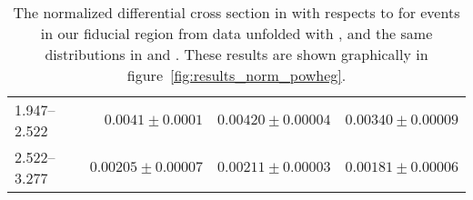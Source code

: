 \begin{table}
\begin{center}
\begin{tabular}{@{}l r r r@{}}
            1.947--2.522  &  $0.0041   \pm  0.0001$   &  $0.00420  \pm  0.00004$  &  $0.00340  \pm  0.00009$  \\
            2.522--3.277  &  $0.00205  \pm  0.00007$  &  $0.00211  \pm  0.00003$  &  $0.00181  \pm  0.00006$  \\
            \bottomrule
        \end{tabular}
    \end{center}
    \caption[
        The normalized differential cross section in \pb with respects to
        \phistar for \Ztoee events in our fiducial region from data unfolded
        with \POWHEG.
    ]{
        The normalized differential cross section in \pb with respects to
        \phistar for \Ztoee events in our fiducial region from data unfolded
        with \POWHEG, and the same distributions in \MADGRAPH and \POWHEG.
        These results are shown graphically in
        figure~\ref{fig:results_norm_powheg}.
    }
    \label{tab:results_norm_powheg}
\end{table}
